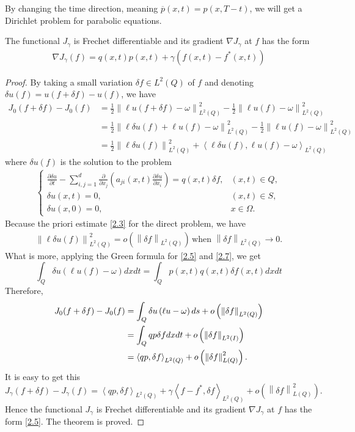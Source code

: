 \documentclass[]{article}
\begin{document}
By changing the time direction, meaning $\overline{p}(x, t)=p(x, T-t)$, we will get a Dirichlet problem for parabolic equations.
\begin{dl}
	The functional $J_\gamma$ is Frechet differentiable and its gradient $\nabla J_\gamma$ at $f$ has the form 
	\begin{align}\label{2.6}
		\nabla J_\gamma(f)=q(x, t)p(x, t)+\gamma \left(f(x, t)-f^*(x, t)\right)
	\end{align}
\end{dl}
\begin{proof}
	By taking a small variation $\delta f \in L^2(Q)$ of $f$ and denoting $\delta u(f)=u(f+\delta f)-u(f)$, we have
	\begin{align*}
		J_0(f+\delta f)-J_0(f)&=\frac{1}{2}\left\|\ell u(f+\delta f)-\omega\right\|^2_{L^2(Q)}-\frac{1}{2}\left\|\ell u(f)-\omega\right\|^2_{L^2(Q)}\\
		&=\frac{1}{2}\left\|\ell \delta u(f) +\ell u(f)-\omega\right\|^2_{L^2(Q)}-\frac{1}{2}\left\|\ell u(f)-\omega\right\|^2_{L^2(Q)}\\
		&=\frac{1}{2}\left\|\ell \delta u(f)\right\|^2_{L^2(Q)}+\left\langle \ell \delta u(f), \ell u(f)-\omega\right\rangle_{L^2(Q)}
	\end{align*}
	where $\delta u(f)$ is the solution to the problem
	\begin{align}\label{2.7}
		\begin{cases}
			\frac{\partial \delta u}{\partial t}-\sum\limits_{i, j=1}^{d}\frac{\partial}{\partial x_j}\left(a_{ji}(x, t)\frac{\partial \delta u}{\partial x_i}\right)=q(x, t)\delta f,&(x, t)\in Q,\\
			\delta u(x, t)=0, & (x, t)\in S,\\
			\delta u(x, 0)=0, &x\in \Omega.
		\end{cases}
	\end{align}
	Because the priori estimate \eqref{2.3} for the direct problem, we have
	\begin{align*}
		\left\|\ell\delta u(f)\right\|_{L^2(Q)}^2=o\left(\left\|\delta f\right\|_{L^2(Q)}\right)\, \text{when } \left\|\delta f\right\|_{L^2(Q)}\to 0.
	\end{align*}
	What is more, applying the Green formula for \eqref{2.5} and \eqref{2.7}, we get
	$$\int_{Q} \delta u \left(\ell u(f)-\omega\right)dxdt=\int_{Q} p(x, t)q(x, t)\delta f(x, t)dxdt$$
	Therefore,
	\begin{align*}
		J_0(f+\delta f)-J_0(f)&=\int_{Q}\delta u\left(\ell u-\omega\right)ds+o\left(\left\|\delta f\right\|_{L^2(Q)}\right)\notag\\
		&=\int_Q qp\delta fdxdt+o\left(\left\|\delta f\right\|_{L^2(I)}\right)\notag\\
		&=\left\langle qp,\delta f \right\rangle_{L^2(Q)}+o\left(\left\|\delta f\right\|^2_{L(Q)}\right).
	\end{align*}
	It is easy to get this
	$$J_\gamma(f+\delta f)-J_\gamma(f)=\left\langle qp,\delta f \right\rangle_{L^2(Q)}+\gamma\left\langle f-f^*,\delta f \right\rangle_{L^2(Q)}+o\left(\left\|\delta f\right\|^2_{L(Q)}\right).$$
	Hence the functional $J_\gamma$ is Frechet differentiable and its gradient $\nabla J_\gamma$ at $f$ has the form \eqref{2.5}. The theorem is proved.
\end{proof}
\end{document}
